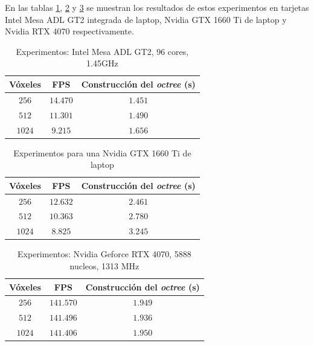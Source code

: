 En las tablas \ref{tab:cisco-laptop}, \ref{tab:pizzo-laptop} y \ref{tab:pizzo-desktop} se muestran los resultados de estos experimentos en tarjetas Intel Mesa ADL GT2 integrada de laptop, Nvidia GTX 1660 Ti de laptop y Nvidia RTX 4070 respectivamente.


\begin{table}[ht]
\centering
\begin{tabular}{|c|c|c|}
	\hline
	\textbf{Vóxeles} & \textbf{FPS} & \textbf{Construcción del \textit{octree} (s)} \\
	\hline
	$256$ & $14.470$ & $1.451$ \\
	\hline
	$512$ & $11.301$ & $1.490$ \\
	\hline
	$1024$ & $9.215$ & $1.656$ \\
	\hline
\end{tabular}
\caption{Experimentos: Intel Mesa ADL GT2, 96 cores, 1.45GHz}
\label{tab:cisco-laptop}
\end{table}

\begin{table}[hb]
\centering
\begin{tabular}{|c|c|c|}
	\hline
	\textbf{Vóxeles} & \textbf{FPS} & \textbf{Construcción del \textit{octree} (s)} \\
	\hline
	$256$ & $12.632$ & $2.461$ \\
	\hline
	$512$ & $10.363$ & $2.780$ \\
	\hline
	$1024$ & $8.825$ & $3.245$ \\
	\hline
\end{tabular}
\caption{Experimentos para una Nvidia GTX 1660 Ti de laptop}
\label{tab:pizzo-laptop}
\end{table}

\begin{table}[hb]
\centering
\begin{tabular}{|c|c|c|}
	\hline
	\textbf{Vóxeles} & \textbf{FPS} & \textbf{Construcción del \textit{octree} (s)} \\
	\hline
	$256$ & $141.570$ & $1.949$ \\
	\hline
	$512$ & $141.496$ & $1.936$ \\
	\hline
	$1024$ & $141.406$ & $1.950$ \\
	\hline
\end{tabular}
\caption{Experimentos: Nvidia Geforce RTX 4070, 5888 nucleos, 1313 MHz}
\label{tab:pizzo-desktop}
\end{table}

